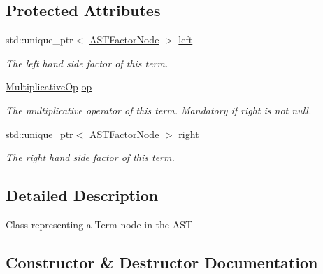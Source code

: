 \subsection*{Protected Attributes}
\begin{DoxyCompactItemize}
\item 
\mbox{\label{classparser_1_1ast_1_1ASTTermNode_a268410bee7baf3e6dd0a1fa64fc0c0e2}} 
std\+::unique\+\_\+ptr$<$ \hyperlink{classparser_1_1ast_1_1ASTFactorNode}{A\+S\+T\+Factor\+Node} $>$ \hyperlink{classparser_1_1ast_1_1ASTTermNode_a268410bee7baf3e6dd0a1fa64fc0c0e2}{left}
\begin{DoxyCompactList}\small\item\em The left hand side factor of this term. \end{DoxyCompactList}\item 
\mbox{\label{classparser_1_1ast_1_1ASTTermNode_a5fca22b04d30310ff59616a7e0863a54}} 
\hyperlink{ASTTermNode_8h_a56419c32f44e139982c327d8375a27a7}{Multiplicative\+Op} \hyperlink{classparser_1_1ast_1_1ASTTermNode_a5fca22b04d30310ff59616a7e0863a54}{op}
\begin{DoxyCompactList}\small\item\em The multiplicative operator of this term. Mandatory if right is not null. \end{DoxyCompactList}\item 
\mbox{\label{classparser_1_1ast_1_1ASTTermNode_a339078e4e969f51d2da01a39585db008}} 
std\+::unique\+\_\+ptr$<$ \hyperlink{classparser_1_1ast_1_1ASTFactorNode}{A\+S\+T\+Factor\+Node} $>$ \hyperlink{classparser_1_1ast_1_1ASTTermNode_a339078e4e969f51d2da01a39585db008}{right}
\begin{DoxyCompactList}\small\item\em The right hand side factor of this term. \end{DoxyCompactList}\end{DoxyCompactItemize}


\subsection{Detailed Description}
Class representing a Term node in the A\+ST 

\subsection{Constructor \& Destructor Documentation}
\mbox{\label{classparser_1_1ast_1_1ASTTermNode_ab37b86959cf1761c460ca678dc44aa3e}} 
